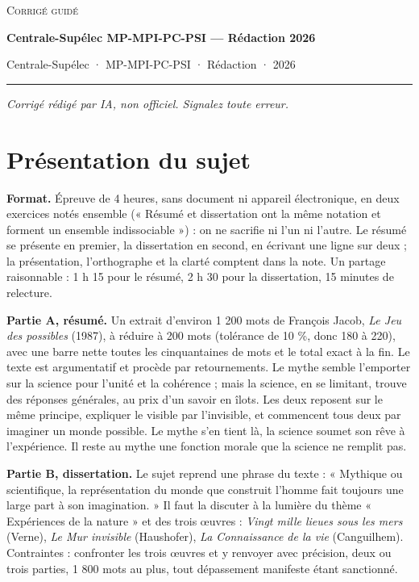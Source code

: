 \documentclass[11pt,a4paper]{article}
\begin{document}
\thispagestyle{plain}
\begin{center}
  {\small\scshape Corrigé guidé}\par\smallskip
  {\LARGE\bfseries Centrale-Supélec MP-MPI-PC-PSI — Rédaction 2026\par}\medskip
  {\large Centrale-Supélec · MP-MPI-PC-PSI · Rédaction · 2026\par}
\end{center}
\vspace{2pt}\hrule\vspace{8pt}

\emph{Corrigé rédigé par IA, non officiel. Signalez toute erreur.}

\hypertarget{pruxe9sentation-du-sujet}{%
\section{Présentation du sujet}\label{pruxe9sentation-du-sujet}}

\textbf{Format.} Épreuve de 4 heures, sans document ni appareil électronique, en deux exercices notés ensemble (« Résumé et dissertation ont la même notation et forment un ensemble indissociable ») : on ne sacrifie ni l'un ni l'autre. Le résumé se présente en premier, la dissertation en second, en écrivant une ligne sur deux ; la présentation, l'orthographe et la clarté comptent dans la note. Un partage raisonnable : 1 h 15 pour le résumé, 2 h 30 pour la dissertation, 15 minutes de relecture.

\textbf{Partie A, résumé.} Un extrait d'environ 1 200 mots de François Jacob, \emph{Le Jeu des possibles} (1987), à réduire à 200 mots (tolérance de 10 \%, donc 180 à 220), avec une barre nette toutes les cinquantaines de mots et le total exact à la fin. Le texte est argumentatif et procède par retournements. Le mythe semble l'emporter sur la science pour l'unité et la cohérence ; mais la science, en se limitant, trouve des réponses générales, au prix d'un savoir en îlots. Les deux reposent sur le même principe, expliquer le visible par l'invisible, et commencent tous deux par imaginer un monde possible. Le mythe s'en tient là, la science soumet son rêve à l'expérience. Il reste au mythe une fonction morale que la science ne remplit pas.

\textbf{Partie B, dissertation.} Le sujet reprend une phrase du texte : « Mythique ou scientifique, la représentation du monde que construit l'homme fait toujours une large part à son imagination. » Il faut la discuter à la lumière du thème « Expériences de la nature » et des trois œuvres : \emph{Vingt mille lieues sous les mers} (Verne), \emph{Le Mur invisible} (Haushofer), \emph{La Connaissance de la vie} (Canguilhem). Contraintes : confronter les trois œuvres et y renvoyer avec précision, deux ou trois parties, 1 800 mots au plus, tout dépassement manifeste étant sanctionné.
\end{document}
